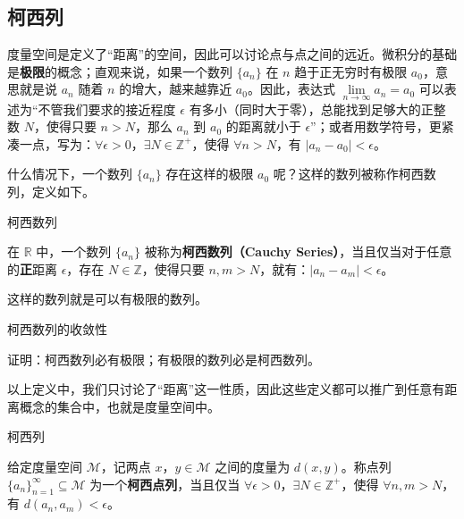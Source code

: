 
\begin{issues}
\end{issues}


\subsection{柯西列}

度量空间是定义了“距离”的空间，因此可以讨论点与点之间的远近。微积分的基础是\textbf{极限}的概念；直观来说，如果一个数列 $\{a_n\}$ 在 $n$ 趋于正无穷时有极限 $a_0$，意思就是说 $a_n$ 随着 $n$ 的增大，越来越靠近 $a_0$。因此，表达式 $\lim\limits_{n\rightarrow\infty}a_n=a_0$ 可以表述为“不管我们要求的接近程度 $\epsilon$ 有多小（同时大于零），总能找到足够大的正整数 $N$，使得只要 $n>N$，那么 $a_n$ 到 $a_0$ 的距离就小于 $\epsilon$”；或者用数学符号，更紧凑一点，写为：$\forall\epsilon>0$，$\exists N\in\mathbb{Z}^+$，使得 $\forall n>N$，有 $|a_n-a_0|<\epsilon$。

什么情况下，一个数列 $\{a_n\}$ 存在这样的极限 $a_0$ 呢？这样的数列被称作柯西数列，定义如下。

\begin{definition}{柯西数列}

在 $\mathbb{R}$ 中，一个数列 $\{a_n\}$ 被称为\textbf{柯西数列（Cauchy Series）}，当且仅当对于任意的\textbf{正}距离 $\epsilon$，存在 $N\in\mathbb{Z}$，使得只要 $n, m>N$，就有：$|a_n-a_m|<\epsilon$。

\end{definition}

这样的数列就是可以有极限的数列。

\begin{exercise}{柯西数列的收敛性}

证明：柯西数列必有极限；有极限的数列必是柯西数列。

\end{exercise}

以上定义中，我们只讨论了“距离”这一性质，因此这些定义都可以推广到任意有距离概念的集合中，也就是度量空间中。

\begin{definition}{柯西列}

给定度量空间 $\mathcal{M}$，记两点 $x$，$y\in\mathcal{M}$ 之间的度量为 $d(x, y)$。称点列 $\{a_n\}_{n=1}^{\infty}\subseteq\mathcal{M}$ 为一个\textbf{柯西点列}，当且仅当 $\forall\epsilon>0$，$\exists N\in\mathbb{Z}^+$，使得 $\forall n, m>N$，有 $d(a_n, a_m)<\epsilon$。

\end{definition}


